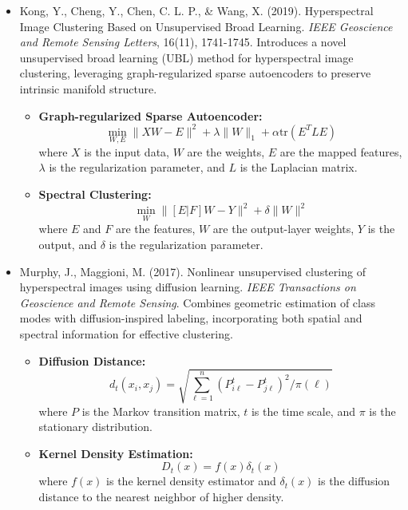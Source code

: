 \documentclass[10pt,svgnames,fragile]{beamer}
\begin{document}
\begin{frame}
\tiny
\begin{itemize}
\item Kong, Y., Cheng, Y., Chen, C. L. P., \& Wang, X. (2019). Hyperspectral Image Clustering Based on Unsupervised Broad Learning. \textit{IEEE Geoscience and Remote Sensing Letters}, 16(11), 1741-1745. \href{https://doi.org/10.1109/LGRS.2019.2907598}{\color{blue}{DOI: 10.1109/LGRS.2019.2907598}}
{\color{gray}Introduces a novel unsupervised broad learning (UBL) method for hyperspectral image clustering, leveraging graph-regularized sparse autoencoders to preserve intrinsic manifold structure.}
\begin{itemize} \tiny
    \item \textbf{Graph-regularized Sparse Autoencoder:}
    \[
    \min_{W, E} \|XW - E\|^2 + \lambda \|W\|_1 + \alpha \text{tr}(E^T L E)
    \]
    where \(X\) is the input data, \(W\) are the weights, \(E\) are the mapped features, \(\lambda\) is the regularization parameter, and \(L\) is the Laplacian matrix.

    \item \textbf{Spectral Clustering:}
    \[
    \min_{W} \|[E|F]W - Y\|^2 + \delta \|W\|^2
    \]
    where \(E\) and \(F\) are the features, \(W\) are the output-layer weights, \(Y\) is the output, and \(\delta\) is the regularization parameter.
\end{itemize}

\end{itemize}
\end{frame}
\begin{frame}{}
\tiny
\begin{itemize}

\item Murphy, J., Maggioni, M. (2017). Nonlinear unsupervised clustering of hyperspectral images using diffusion learning. \textit{IEEE Transactions on Geoscience and Remote Sensing}. \href{https://consensus.app/papers/nonlinear-unsupervised-clustering-hyperspectral-images-murphy/597889a520fb5df7a71b73129aa8aafa/?utm_source=chatgpt}{\color{blue}{DOI: 10.1109/TGRS.2017.2672099}}
{\color{gray}Combines geometric estimation of class modes with diffusion-inspired labeling, incorporating both spatial and spectral information for effective clustering.}
\begin{itemize} \tiny
    \item \textbf{Diffusion Distance:}
    \[
    d_t(x_i, x_j) = \sqrt{\sum_{\ell=1}^n (P^t_{i\ell} - P^t_{j\ell})^2 / \pi(\ell)}
    \]
    where \(P\) is the Markov transition matrix, \(t\) is the time scale, and \(\pi\) is the stationary distribution.
    \item \textbf{Kernel Density Estimation:}
    \[
    D_t(x) = f(x) \delta_t(x)
    \]
    where \(f(x)\) is the kernel density estimator and \(\delta_t(x)\) is the diffusion distance to the nearest neighbor of higher density.
\end{itemize}
 
\end{itemize}
\end{frame}
\end{document}
